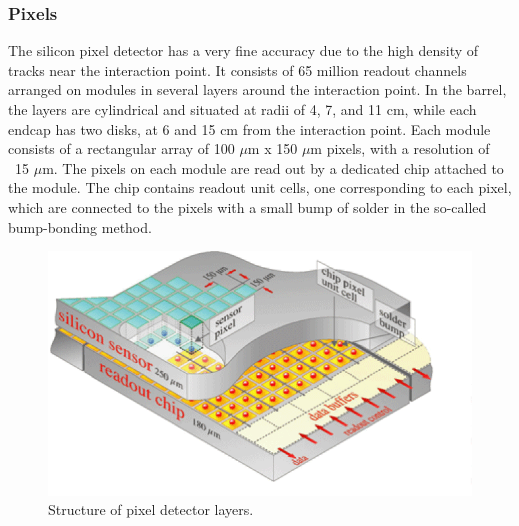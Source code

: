\subsubsection{Pixels}
\label{exp:pixels}
The silicon pixel detector has a very fine accuracy
due to the high density of tracks near the interaction point.  
It consists of 65 million readout channels 
arranged on modules in several layers around the interaction point.
In the barrel, the layers are cylindrical and situated at
radii of 4, 7, and 11 cm, 
while each endcap has two disks, at 6 and 15 cm from the
interaction point. 
Each module consists of a rectangular array of 100 $\mu$m x 150 $\mu$m pixels, 
with a resolution of ~15 $\mu$m.  
The pixels on each module are read out by a dedicated chip attached 
to the module. 
The chip contains readout unit cells, one corresponding to each pixel,
which are connected to the pixels with a small bump of solder 
in the so-called bump-bonding method.  

 \begin{figure}[htb]
  \begin{center}
    \includegraphics[width=360pt]{Figures/tracker-Pixelement.png}
  \end{center}
  \caption[\fixspacing Structure of pixel detector layers]
	  {\fixspacing Structure of pixel detector layers.}
  \label{fig:PixelLayers}
 \end{figure}

